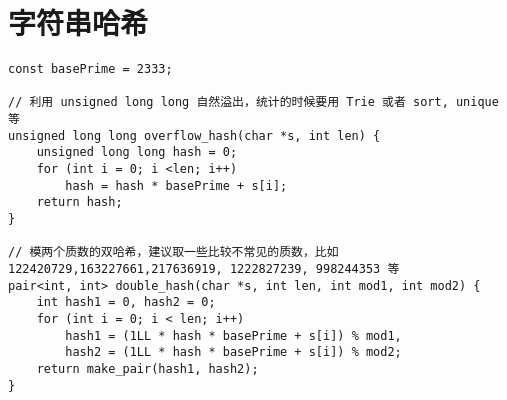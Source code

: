 \section{字符串哈希}

\begin{verbatim}
const basePrime = 2333;

// 利用 unsigned long long 自然溢出，统计的时候要用 Trie 或者 sort, unique 等
unsigned long long overflow_hash(char *s, int len) {
    unsigned long long hash = 0;
    for (int i = 0; i <len; i++)
        hash = hash * basePrime + s[i];
    return hash;
}

// 模两个质数的双哈希，建议取一些比较不常见的质数，比如 122420729,163227661,217636919, 1222827239, 998244353 等
pair<int, int> double_hash(char *s, int len, int mod1, int mod2) {
    int hash1 = 0, hash2 = 0;
    for (int i = 0; i < len; i++)
        hash1 = (1LL * hash * basePrime + s[i]) % mod1,
        hash2 = (1LL * hash * basePrime + s[i]) % mod2;
    return make_pair(hash1, hash2);
}
\end{verbatim}

